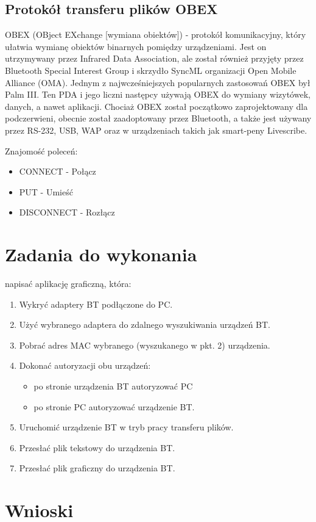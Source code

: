 \documentclass[a4paper,12pt]{extarticle}  %
\begin{document}
\subsection{Protokół transferu plików OBEX}
OBEX (OBject EXchange [wymiana obiektów]) - protokół komunikacyjny, który ułatwia wymianę obiektów binarnych pomiędzy urządzeniami. 
Jest on utrzymywany przez Infrared Data Association, ale został również przyjęty przez Bluetooth Special Interest Group i skrzydło SyncML 
organizacji Open Mobile Alliance (OMA). Jednym z najwcześniejszych popularnych zastosowań OBEX był Palm III.
Ten PDA i jego liczni następcy używają OBEX do wymiany wizytówek, danych, a nawet aplikacji. Chociaż OBEX został początkowo zaprojektowany 
dla podczerwieni, obecnie został zaadoptowany przez Bluetooth, a także jest używany przez RS-232, USB, WAP oraz w urządzeniach takich 
jak smart-peny Livescribe. 

Znajomość poleceń:
\begin{itemize}
	\item CONNECT - Połącz
	\item PUT - Umieść
	\item DISCONNECT - Rozłącz
\end{itemize}
\section{Zadania do wykonania}
napisać aplikację graficzną, która:
\begin{enumerate}
	\item Wykryć adaptery BT podłączone do PC.
	\item Użyć wybranego adaptera do zdalnego wyszukiwania urządzeń BT.
	\item Pobrać adres MAC wybranego (wyszukanego w pkt. 2) urządzenia.
	\item Dokonać autoryzacji obu urządzeń:
	      \begin{itemize}
		      \item po stronie urządzenia BT autoryzować PC
		      \item po stronie PC autoryzować urządzenie BT.
	      \end{itemize}
	\item Uruchomić urządzenie BT w tryb pracy transferu plików.
	\item Przesłać plik tekstowy do urządzenia BT.
	\item Przesłać plik graficzny do urządzenia BT.
\end{enumerate}
\section{Wnioski}
\end{document}
